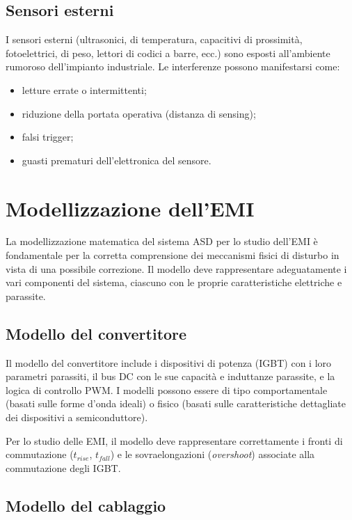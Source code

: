 \subsection{Sensori esterni}

I sensori esterni (ultrasonici, di temperatura, capacitivi di prossimità, fotoelettrici, di peso, lettori di codici a barre, ecc.) sono esposti all'ambiente rumoroso dell'impianto industriale. Le interferenze possono manifestarsi come:

\begin{itemize}
\item letture errate o intermittenti;
\item riduzione della portata operativa (distanza di sensing);
\item falsi trigger;
\item guasti prematuri dell'elettronica del sensore.
\end{itemize}

\section{Modellizzazione dell'EMI}

La modellizzazione matematica del sistema ASD per lo studio dell'EMI è fondamentale per la corretta comprensione dei meccanismi fisici di disturbo in vista di una possibile correzione. Il modello deve rappresentare adeguatamente i vari componenti del sistema, ciascuno con le proprie caratteristiche elettriche e parassite.

\subsection{Modello del convertitore}

Il modello del convertitore include i dispositivi di potenza (IGBT) con i loro parametri parassiti, il bus DC con le sue capacità e induttanze parassite, e la logica di controllo PWM. I modelli possono essere di tipo comportamentale (basati sulle forme d'onda ideali) o fisico (basati sulle caratteristiche dettagliate dei dispositivi a semiconduttore).

Per lo studio delle EMI, il modello deve rappresentare correttamente i fronti di commutazione ($t_{rise}$, $t_{fall}$) e le sovraelongazioni (\textit{overshoot}) associate alla commutazione degli IGBT.

\subsection{Modello del cablaggio}

